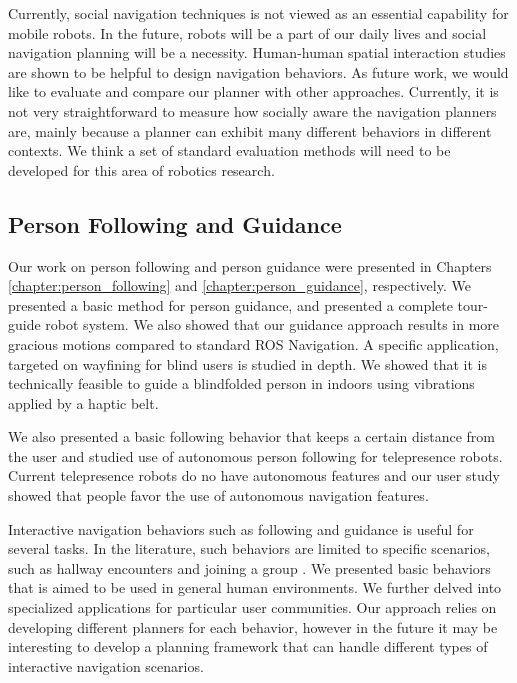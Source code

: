 	
Currently, social navigation techniques is not viewed as an essential capability for mobile robots. In the future, robots will be a part of our daily lives and social navigation planning will be a necessity. Human-human spatial interaction studies are shown to be helpful to design navigation behaviors. As future work, we would like to evaluate and compare our planner with other approaches. Currently, it is not very straightforward to measure how socially aware the navigation planners are, mainly because a planner can exhibit many different behaviors in different contexts. We think a set of standard evaluation methods will need to be developed for this area of robotics research.


\subsection{Person Following and Guidance}

Our work on person following and person guidance were presented in Chapters \ref{chapter:person_following} and \ref{chapter:person_guidance}, respectively. We presented a basic method for person guidance, and presented a complete tour-guide robot system. We also showed that our guidance approach results in more gracious motions compared to standard ROS Navigation. A specific application, targeted on wayfining for blind users is studied in depth. We showed that it is technically feasible to guide a blindfolded person in indoors using vibrations applied by a haptic belt.

We also presented a basic following behavior that keeps a certain distance from the user and studied use of autonomous person following for telepresence robots. Current telepresence robots do no have autonomous features and our user study showed that people favor the use of autonomous navigation features.

Interactive navigation behaviors such as following and guidance is useful for several tasks. In the literature, such behaviors are limited to specific scenarios, such as hallway encounters \cite{pacchierotti2005human} and joining a group \cite{althaus2004navigation}. We presented basic behaviors that is aimed to be used in general human environments. We further delved into specialized applications for particular user communities. Our approach relies on developing different planners for each behavior, however in the future it may be interesting to develop a planning framework that can handle different types of interactive navigation scenarios.

